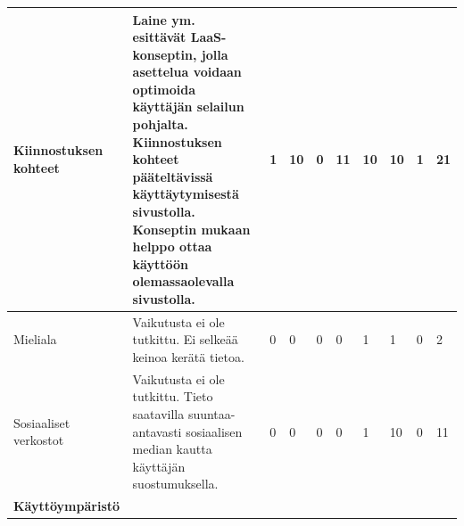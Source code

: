\documentclass[finnish, 12pt, a4paper, elec, utf8, a-1b, online]{aaltothesis}
\begin{document}
{\begin{longtable}{p{2.5cm}|p{6cm}|p{0.5cm}p{0.5cm}p{0.5cm}|p{0.5cm}|p{0.5cm}p{0.5cm}p{0.5cm}|p{0.5cm}|}
    \midrule
    Kiinnostuksen kohteet                   & Laine ym.~\cite{laine2020_laas} esittävät LaaS-konseptin, jolla asettelua voidaan optimoida käyttäjän selailun pohjalta. Kiinnostuksen kohteet pääteltävissä käyttäytymisestä sivustolla. Konseptin mukaan helppo ottaa käyttöön olemassaolevalla sivustolla.                                                                     & 1                                          & 10                                  & 0                                      & 11                           & 10                                              & 10                                        & 1                                         & 21                           \\
    \midrule
    Mieliala                                & Vaikutusta ei ole tutkittu. Ei selkeää keinoa kerätä tietoa.                                                                                                                                                                                                                                                                      & 0                                          & 0                                   & 0                                      & 0                            & 1                                               & 1                                         & 0                                         & 2                            \\
    \midrule
    Sosiaaliset verkostot                   & Vaikutusta ei ole tutkittu. Tieto saatavilla suuntaa-antavasti sosiaalisen median kautta käyttäjän suostumuksella.                                                                                                                                                                                                                & 0                                          & 0                                   & 0                                      & 0                            & 1                                               & 10                                        & 0                                         & 11                           \\
    \midrule
    \textbf{Käyttöympäristö}                                                                                                                                                                                                                                                                                                                                                                                                                                                                                                                                                                                                                                                                                        \\

\end{longtable}}
\end{document}
